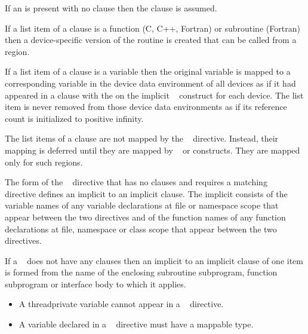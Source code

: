 {{{{\begin{samepage}
If an  is present with no clause then the 
clause is assumed.

If a list item of a  clause is a function (C, C++, Fortran) 
or subroutine (Fortran) then a device-specific version of the routine is 
created that can be called from a  region.

\end{samepage}

If a list item of a  clause is a variable then the original 
variable is mapped to a corresponding variable in the device data environment 
of all devices as if it had appeared in a  clause with the
  on the implicit ~ construct 
for each device. The list item is never removed from those device data 
environments as if its reference count is initialized to positive infinity.

The list items of a  clause are not mapped 
by the ~ directive. Instead, their mapping
is deferred until they are mapped by ~ 
or  constructs. They are mapped only for such regions.

\pagebreak
\ccppspecificstart
The form of the ~ directive that has no clauses 
and requires a matching ~~ directive
defines an implicit  to an implicit 
clause. The implicit  consists of the variable names 
of any variable declarations at file or namespace scope that appear between 
the two directives and of the function names of any function declarations at 
file, namespace or class scope that appear between the two directives.
\ccppspecificend

\fortranspecificstart
If a ~ does not have any clauses then an implicit 
 to an implicit  clause of one item is formed from
the name of the enclosing subroutine subprogram, function subprogram or 
interface body to which it applies.
\fortranspecificend

\restrictions
\begin{itemize}
\item A threadprivate variable cannot appear in a 
      ~ directive.

\item A variable declared in a ~ directive 
      must have a mappable type.


\end{itemize}}}}}
